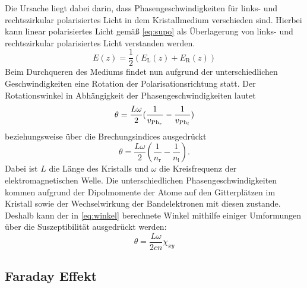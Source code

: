 Die Ursache liegt dabei darin, dass Phasengeschwindigkeiten für links- und rechtszirkular polarisiertes Licht in dem Kristallmedium verschieden sind.
Hierbei kann linear polarisiertes Licht gemäß \eqref{eq:supo} als Überlagerung von links- und rechtszirkular polarisiertes Licht verstanden werden.
\begin{equation}
    E(z)=\frac{1}{2}(E_\text{L}(z)+E_\text{R}(z))
    \label{eq:supo}
\end{equation}
Beim Durchqueren des Mediums findet nun aufgrund der unterschiedlichen Geschwindigkeiten eine Rotation der Polarisationsrichtung statt.
Der Rotationswinkel in Abhängigkeit der Phasengeschwindigkeiten lautet
\begin{equation}
    \theta = \frac{L\omega}{2}(\frac{1}{v_{\text{Ph}_r}}-\frac{1}{v_{\text{Ph}_l}})
    \notag
\end{equation}
beziehungsweise über die Brechungsindices ausgedrückt
\begin{equation}
    \theta = \frac{L\omega}{2}(\frac{1}{n_{\text{r}}}-\frac{1}{n_{\text{l}}}).
    \label{eq:winkel}
\end{equation}
Dabei ist $L$ die Länge des Kristalls und $\omega$ die Kreisfrequenz der elektromagnetischen Welle.
Die unterschiedlichen Phasengeschwindigkeiten kommen aufgrund der Dipolmomente der Atome auf den Gitterplätzen im Kristall sowie
der Wechselwirkung der Bandelektronen mit diesen zustande. Deshalb kann der in \eqref{eq:winkel} berechnete Winkel mithilfe einiger
Umformungen über die Suszeptibilität ausgedrückt werden:
\begin{equation}
    \theta = \frac{L\omega}{2cn}\chi_{xy}
    \label{eq:thetatensor}
\end{equation}

\subsection{Faraday Effekt}


